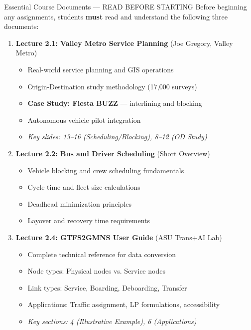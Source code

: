 \documentclass[11pt,letterpaper]{article}
\begin{document}
\begin{readingbox}{Essential Course Documents --- READ BEFORE STARTING}
Before beginning any assignments, students \textbf{must} read and understand the following three documents:

\begin{enumerate}[leftmargin=*]
    \item \textbf{Lecture 2.1: Valley Metro Service Planning} (Joe Gregory, Valley Metro)
    \begin{itemize}
        \item Real-world service planning and GIS operations
        \item Origin-Destination study methodology (17,000 surveys)
        \item \textcolor{asumaroon}{\textbf{Case Study: Fiesta BUZZ}} --- interlining and blocking
        \item Autonomous vehicle pilot integration
        \item \textit{Key slides: 13--16 (Scheduling/Blocking), 8--12 (OD Study)}
    \end{itemize}
    
    \item \textbf{Lecture 2.2: Bus and Driver Scheduling} (Short Overview)
    \begin{itemize}
        \item Vehicle blocking and crew scheduling fundamentals
        \item Cycle time and fleet size calculations
        \item Deadhead minimization principles
        \item Layover and recovery time requirements
    \end{itemize}
    
    \item \textbf{Lecture 2.4: GTFS2GMNS User Guide} (ASU Trans+AI Lab)
    \begin{itemize}
        \item Complete technical reference for data conversion
        \item Node types: Physical nodes vs. Service nodes
        \item Link types: Service, Boarding, Deboarding, Transfer
        \item Applications: Traffic assignment, LP formulations, accessibility
        \item \textit{Key sections: 4 (Illustrative Example), 6 (Applications)}
    \end{itemize}
\end{enumerate}
\end{readingbox}
\end{document}
